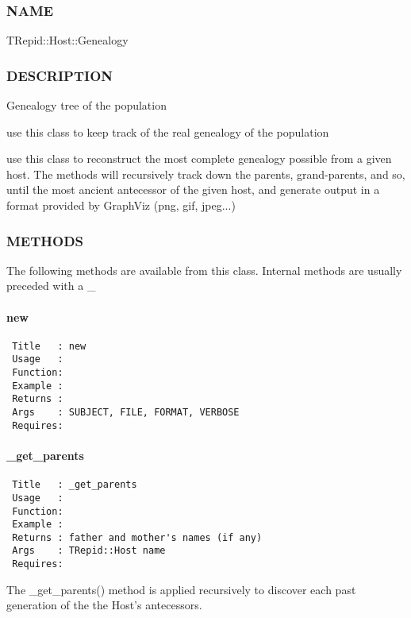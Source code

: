 \subsubsection*{NAME\label{NAME}}


TRepid::Host::Genealogy

\subsubsection*{DESCRIPTION\label{DESCRIPTION}}


Genealogy tree of the population



use this class to keep track of the real genealogy of the population



use this class to reconstruct the most complete genealogy possible
from a given host. The methods will recursively track down the
parents, grand-parents, and so, until the most ancient antecessor of
the given host, and generate output in a format provided by GraphViz
(png, gif, jpeg...)

\subsubsection*{METHODS\label{METHODS}}


The following methods are available from this class. Internal methods
are usually preceded with a \_

\paragraph*{new\label{new}}
\begin{verbatim}
 Title   : new
 Usage   :
 Function: 
 Example : 
 Returns : 
 Args    : SUBJECT, FILE, FORMAT, VERBOSE
 Requires:
\end{verbatim}
\paragraph*{\_get\_parents\label{_get_parents}}
\begin{verbatim}
 Title   : _get_parents
 Usage   : 
 Function: 
 Example : 
 Returns : father and mother's names (if any)
 Args    : TRepid::Host name
 Requires:
\end{verbatim}


The \_get\_parents() method is applied recursively to discover each past
generation of the the Host's antecessors.



